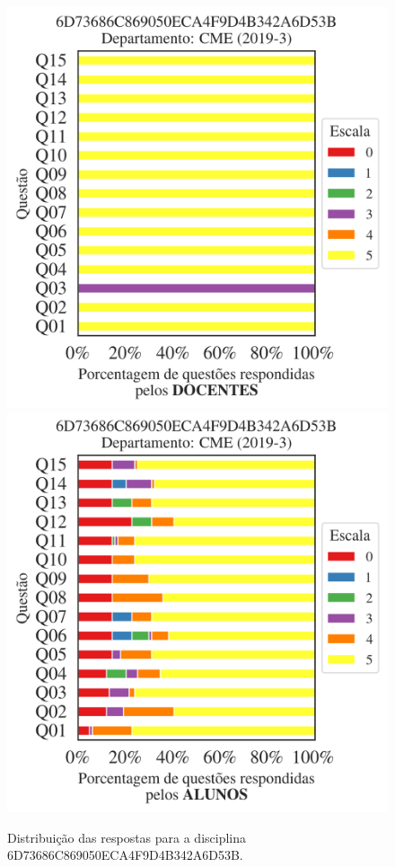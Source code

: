 \documentclass[a4paper,10pt]{article}
\begin{document}
\begin{figure}[h]
\centering
\includegraphics[width=0.485\linewidth]{analise_disciplina_departamento_CME_6D73686C869050ECA4F9D4B342A6D53B_docentes.png}
\includegraphics[width=0.485\linewidth]{analise_disciplina_departamento_CME_6D73686C869050ECA4F9D4B342A6D53B_alunos.png}
\caption{\label{fig:analise_geral_departamento}                Distribuição das respostas para a disciplina 6D73686C869050ECA4F9D4B342A6D53B. }
\end{figure}
\end{document}
